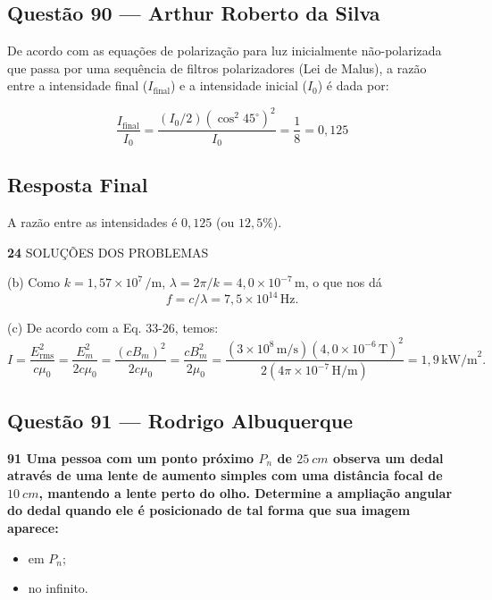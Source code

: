 \documentclass[12pt,a4paper]{article}
\begin{document}
\subsection{Questão 90 — Arthur Roberto da Silva}
De acordo com as equações de polarização para luz inicialmente não-polarizada que passa por uma sequência de filtros polarizadores (Lei de Malus), a razão entre a intensidade final ($I_{\text{final}}$) e a intensidade inicial ($I_0$) é dada por:

\begin{equation*}
\frac{I_{\text{final}}}{I_0} = \frac{(I_0 / 2)(\cos^2 45^\circ)^2}{I_0} = \frac{1}{8} = 0,125
\end{equation*}

\subsection*{Resposta Final}
A razão entre as intensidades é \textbf{$0,125$} (ou \textbf{$12,5\%$}).


\vspace{3cm} %

\noindent \textbf{24} \hspace{1cm} SOLUÇÕES DOS PROBLEMAS

\vspace{1cm}

\noindent (b) Como $k = 1,57 \times 10^7 \, \text{/m}$, $\lambda = 2\pi/k = 4,0 \times 10^{-7} \, \text{m}$, o que nos dá
\[
f = c/\lambda = 7,5 \times 10^{14} \, \text{Hz}.
\]

\noindent (c) De acordo com a Eq. 33-26, temos:
\[
I = \frac{E_{\text{rms}}^2}{c\mu_0} = \frac{E_m^2}{2c\mu_0} = \frac{(cB_m)^2}{2c\mu_0} = \frac{cB_m^2}{2\mu_0} = \frac{(3 \times 10^8 \, \text{m/s})(4,0 \times 10^{-6} \, \text{T})^2}{2(4\pi \times 10^{-7} \, \text{H/m})} = 1,9 \, \text{kW/m}^2.
\]

\subsection{Questão 91 — Rodrigo Albuquerque }

\textbf{91 Uma pessoa com um ponto próximo \(P_n\) de \(25\ cm\) observa um dedal através de uma lente de aumento simples com uma distância focal de \(10\ cm\), mantendo a lente perto do olho. Determine a ampliação angular do dedal quando ele é posicionado de tal forma que sua imagem aparece:}

\begin{itemize}
\item[(a)] em \(P_n\);
\item[(b)] no infinito.
\end{itemize}
\end{document}
